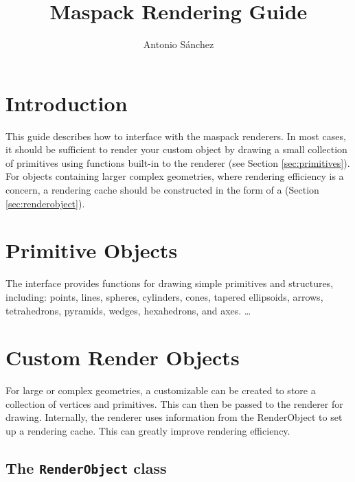 \documentclass{article}
\title{Maspack Rendering Guide}
\author{Antonio S\'anchez}
\date{}
\begin{document}
\maketitle

\iflatexml{\large\pubdate}\fi

\tableofcontents



\section{Introduction}

This guide describes how to interface with the maspack renderers.  In most cases,
it should be sufficient to render your custom object by drawing a small collection of 
primitives using functions built-in to the renderer (see Section \ref{sec:primitives}).
For objects containing larger complex geometries, where rendering efficiency
is a concern, a rendering cache should be constructed in the form of a 
 (Section \ref{sec:renderobject}).

\section{Primitive Objects \label{sec:primitives}}

The  interface provides functions for drawing simple
primitives and structures, including: points, lines, spheres, cylinders,
cones, tapered ellipsoids, arrows, tetrahedrons, pyramids, wedges, hexahedrons,
and axes.  \ldots

\section{Custom Render Objects}

For large or complex geometries, a customizable  can be 
created to store a collection of vertices and primitives.  This can then be
passed to the renderer for drawing.  Internally, the renderer uses information
from the RenderObject to set up a rendering cache.  This can greatly improve
rendering efficiency.

\subsection{The \texttt{RenderObject} class \label{sec:renderobject}}
\end{document}
